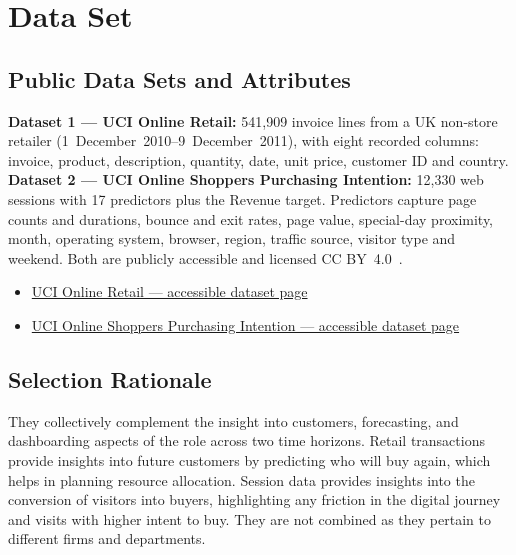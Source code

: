 \section{Data Set}
\label{sec:Data Set}

\subsection{Public Data Sets and Attributes}

\textbf{Dataset 1 --- UCI Online Retail:} 541,909 invoice lines from a UK non-store retailer (1~December~2010--9~December~2011), with eight recorded columns: invoice, product, description, quantity, date, unit price, customer ID and country. \textbf{Dataset 2 --- UCI Online Shoppers Purchasing Intention:} 12,330 web sessions with 17 predictors plus the Revenue target. Predictors capture page counts and durations, bounce and exit rates, page value, special-day proximity, month, operating system, browser, region, traffic source, visitor type and weekend. Both are publicly accessible and licensed CC BY~4.0~\cite{chen2015onlineretail,sakar2018onlineshoppers}.

\begin{itemize}
    \item \href{https://archive.ics.uci.edu/dataset/352/online+retail}{UCI Online Retail --- accessible dataset page}
    \item \href{https://archive.ics.uci.edu/dataset/468/online+shoppers+purchasing+intention+dataset}{UCI Online Shoppers Purchasing Intention --- accessible dataset page}
\end{itemize}


\subsection{Selection Rationale}

They collectively complement the insight into customers, forecasting, and dashboarding aspects of the role across two time horizons. Retail transactions provide insights into future customers by predicting who will buy again, which helps in planning resource allocation. Session data provides insights into the conversion of visitors into buyers, highlighting any friction in the digital journey and visits with higher intent to buy. They are not combined as they pertain to different firms and departments.

